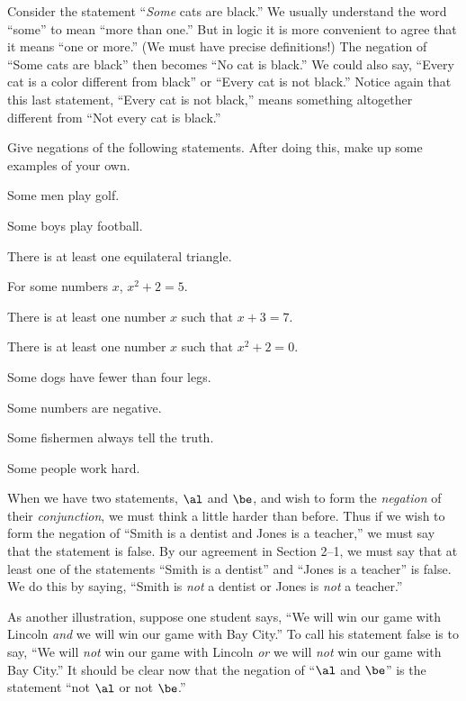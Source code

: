 \documentclass[11pt]{book}
\theoremstyle{bkplain}
\theoremstyle{XIplainnote}
\theoremstyle{bkplain}
\theoremstyle{bkplain}
\begin{document}
Consider the statement ``\emph{Some} cats are black.'' We usually understand the
word ``some'' to mean ``more than one.'' But in logic it is more convenient to
agree that it means ``one or more.'' (We must have precise definitions!) The
negation of ``Some cats are black'' then becomes ``No cat is black.'' We could
also say, ``Every cat is a color different from black'' or ``Every cat is not
black.'' Notice again that this last statement, ``Every cat is not black,'' means
something altogether different from ``Not every cat is black.''


Give negations of the following statements. After doing this, make up some
examples of your own.

\begin{exercisecols}
\begin{exlist}
\item Some men play golf.
\item Some boys play football.
\item There is at least one equilateral triangle.
\item For some numbers $x$, $x^2 + 2 = 5$.
\item There is at least one number $x$ such that $x + 3 = 7$.
\item There is at least one number $x$ such that $x^2 + 2 = 0$.
\item Some dogs have fewer than four legs.
\item[\stex 8.] Some numbers are negative.
\item[9.] Some fishermen always tell the truth.
\item[10.] Some people work hard.
\end{exlist}
\end{exercisecols}

When we have two statements, $\al$ and $\be$, and wish to form the \emph{negation}
of their \emph{conjunction}, we must think a little harder than before. Thus if we
wish to form the negation of ``Smith is a dentist and Jones is a teacher,'' we
must say that the statement is false. By our agreement in Section 2--1, we must
say that at least one of the statements ``Smith is a dentist'' and ``Jones is a
teacher'' is false. We do this by saying, ``Smith is \emph{not} a dentist or Jones
is \emph{not} a teacher.''

As another illustration, suppose one student says, ``We will win our game with
Lincoln \emph{and} we will win our game with Bay City.'' To call his statement
false is to say, ``We will \emph{not} win our game with Lincoln \emph{or} we will
\emph{not} win our game with Bay City.'' It should be clear now that the negation
of ``$\al$ and $\be$'' is the statement ``not $\al$ or not $\be$.''
\end{document}
